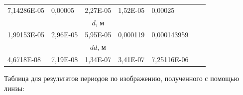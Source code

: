 \documentclass[a4paper,12pt]{article}
\begin{document}
\begin{table}[h!]
\begin{tabular}{|c|l|l|l|l|ll}
		\multicolumn{1}{|l|}{7,14286E-05} & 0,00005  & 2,27E-05 & 1,52E-05 & 0,00025     &                                &                             \\ \cline{1-5}
		\multicolumn{5}{|c|}{$d$, м}                                                       &                                &                             \\ \cline{1-5}
		\multicolumn{1}{|l|}{1,99153E-05} & 2,96E-05 & 5,95E-05 & 0,000119 & 0,000143959 &                                &                             \\ \cline{1-5}
		\multicolumn{5}{|c|}{$dd$, м}                                                      &                                &                             \\ \cline{1-5}
		\multicolumn{1}{|l|}{4,6718E-08}  & 7,19E-08 & 1,34E-07 & 3,41E-07 & 7,25116E-06 &                                &                             \\ \cline{1-5}
	\end{tabular}
\end{table}

Таблица для результатов периодов по изображению, полученного с помощью линзы:
\end{document}
